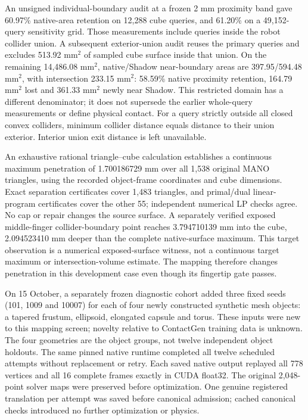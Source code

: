 \documentclass[10pt,letterpaper]{article}
\begin{document}
An unsigned individual-boundary audit at a frozen 2 mm proximity band gave
60.97\% native-area retention on 12,288 cube queries, and 61.20\% on a
49,152-query sensitivity grid. Those measurements include queries inside the
robot collider union. A subsequent exterior-union audit reuses the primary
queries and excludes 513.92 $\mathrm{mm}^2$ of sampled cube surface inside that
union. On the remaining 14,486.08 $\mathrm{mm}^2$, native/Shadow near-boundary
areas are 397.95/594.48 $\mathrm{mm}^2$, with intersection 233.15
$\mathrm{mm}^2$: 58.59\% native proximity retention, 164.79 $\mathrm{mm}^2$
lost and 361.33 $\mathrm{mm}^2$ newly near Shadow. This restricted domain
has a different denominator; it does not supersede the earlier whole-query
measurements or define physical contact. For a query strictly outside all
closed convex colliders, minimum collider distance equals distance to their
union exterior. Interior union exit distance is left unavailable.

An exhaustive rational triangle--cube calculation establishes a continuous
maximum penetration of 1.700186729 mm over all 1,538 original MANO triangles,
using the recorded object-frame coordinates and cube dimensions. Exact
separation certificates cover 1,483 triangles, and primal/dual linear-program
certificates cover the other 55; independent numerical LP checks agree.
No cap or repair changes the source surface. A separately verified exposed
middle-finger collider-boundary point reaches 3.794710139 mm into the cube,
2.094523410 mm deeper than the complete native-surface maximum. This target
observation is a numerical exposed-surface witness, not a continuous target
maximum or intersection-volume estimate. The mapping therefore changes
penetration in this development case even though its fingertip gate passes.

On 15 October, a separately frozen diagnostic cohort added three fixed seeds
(101, 1009 and 10007) for each of four newly constructed synthetic mesh objects:
a tapered frustum, ellipsoid, elongated capsule and torus. These inputs were new
to this mapping screen; novelty relative to ContactGen training data is unknown.
The four geometries are the object groups, not twelve independent object
holdouts. The same pinned native runtime completed all twelve scheduled
attempts without replacement or retry. Each saved native output replayed all
778 vertices and all 16 complete frames exactly in CUDA float32. The original
2,048-point solver maps were preserved before optimization. One genuine
registered translation per attempt was saved before canonical admission;
cached canonical checks introduced no further optimization or physics.
\end{document}
